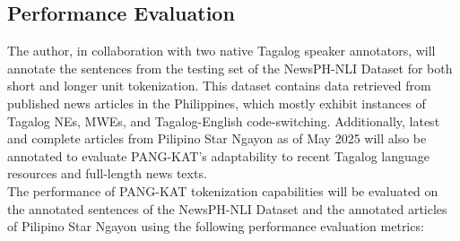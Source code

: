\documentclass[journal]{./IEEE/IEEEtran}
\begin{document}
\subsection {Performance Evaluation}

The author, in collaboration with two native Tagalog speaker annotators, will annotate the sentences from the testing set of the NewsPH-NLI Dataset {\cite{NewsPH-NLI}} for both short and longer unit tokenization. This dataset contains data retrieved from published news articles in the Philippines, which mostly exhibit instances of Tagalog NEs, MWEs, and Tagalog-English code-switching. Additionally, latest and complete articles from Pilipino Star Ngayon {\cite{PhilStar}} as of May 2025 will also be annotated to evaluate PANG-KAT's adaptability to recent Tagalog language resources and full-length news texts. \\

The performance of PANG-KAT tokenization capabilities will be evaluated on the annotated sentences of the NewsPH-NLI Dataset and the annotated articles of Pilipino Star Ngayon using the following performance evaluation metrics:\\
\end{document}
